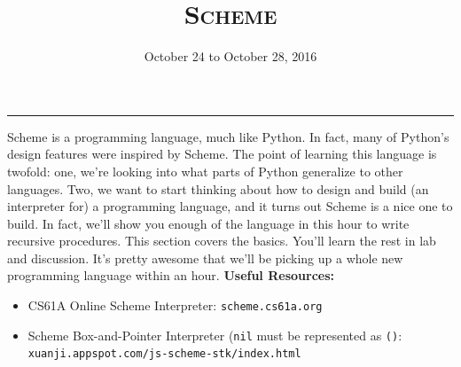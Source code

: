 \documentclass{exam}
\title{\textsc{Scheme}}
\date{October 24 to October 28, 2016}
\begin{document}
\maketitle
\rule{\textwidth}{0.15em}
\fontsize{12}{15}\selectfont




\begin{blocksection}
Scheme is a programming language, much like Python. In fact, many of Python's design features were inspired by Scheme. The point of learning this language is twofold: one, we're looking into what parts of Python generalize to other languages. Two, we want to start thinking about how to design and build (an interpreter  for) a programming language, and it turns out Scheme is a nice one to build. In fact, we'll show you enough of the language in this hour to write recursive procedures. This section covers the basics. You'll learn the rest in lab and discussion. It's pretty awesome that we'll be picking up a whole new programming language within an hour.
\newline
\newline
\textbf{Useful Resources:}
\begin{itemize}
    \item CS61A Online Scheme Interpreter: \texttt{scheme.cs61a.org}
    \item Scheme Box-and-Pointer Interpreter (\texttt{nil} must be represented
        as \texttt{()}: \texttt{xuanji.appspot.com/js-scheme-stk/index.html}
\end{itemize}
\end{blocksection}
\end{document}
